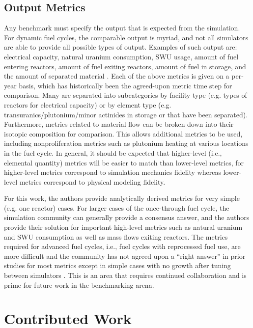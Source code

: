 \documentclass{anstrans}
\begin{document}
\subsection{Output Metrics}
Any benchmark must specify the output that is expected from the simulation. For
dynamic fuel cycles, the comparable output is myriad, and not all simulators are
able to provide all possible types of output. Examples of such output are:
electrical capacity, natural uranium consumption, SWU usage, amount of fuel
entering reactors, amount of fuel exiting reactors, amount of fuel in storage,
and the amount of separated material
\cite{boucher_specification_2008}\cite{guerin_benchmark_2009}. Each of the above
metrics is given on a per-year basis, which has historically been the
agreed-upon metric time step for comparison. Many are separated into
subcategories by facility type (e.g. types of reactors for electrical capacity)
or by element type (e.g. transuranics/plutonium/minor actinides in storage or
that have been separated). Furthermore, metrics related to material flow can be
broken down into their isotopic composition for comparison. This allows
additional metrics to be used, including nonproliferation metrics such as
plutonium heating at various locations in the fuel cycle. In general, it should
be expected that higher-level (i.e., elemental quantity) metrics will be easier
to match than lower-level metrics, for higher-level metrics correspond to
simulation mechanics fidelity whereas lower-level metrics correspond to physical
modeling fidelity.

For this work, the authors provide analytically derived metrics for very simple
(e.g. one reactor) cases. For larger cases of the once-through fuel cycle, the
simulation community can generally provide a consensus answer, and the authors
provide their solution for important high-level metrics such as natural uranium
and SWU consumption as well as mass flows exiting reactors. The metrics required
for advanced fuel cycles, i.e., fuel cycles with reprocessed fuel use, are more
difficult and the community has not agreed upon a ``right answer'' in prior
studies for most metrics except in simple cases with no growth after tuning
between simulators \cite{guerin_benchmark_2009}. This is an area that requires
continued collaboration and is prime for future work in the benchmarking arena.

\section{Contributed Work}
\end{document}
